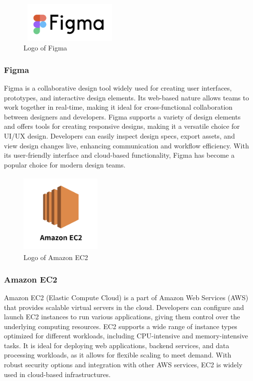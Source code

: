 \documentclass[conference]{IEEEtran}
\begin{document}
        \begin{figure}[htbp]
            \centerline{\includegraphics[width=5cm, height=2cm]{Images/logo/figma.png}}
            \caption{Logo of Figma}
            \label{fig}
        \end{figure}
        \subsubsection{Figma}
            Figma is a collaborative design tool widely used for creating user interfaces, prototypes, and interactive design elements. Its web-based nature allows teams to work together in real-time, making it ideal for cross-functional collaboration between designers and developers. Figma supports a variety of design elements and offers tools for creating responsive designs, making it a versatile choice for UI/UX design. Developers can easily inspect design specs, export assets, and view design changes live, enhancing communication and workflow efficiency. With its user-friendly interface and cloud-based functionality, Figma has become a popular choice for modern design teams.

        \begin{figure}[htbp]
            \centerline{\includegraphics[width=4cm, height=4cm]{Images/logo/aws.png}}
            \caption{Logo of Amazon EC2}
            \label{fig}
        \end{figure}
        \subsubsection{Amazon EC2}
            Amazon EC2 (Elastic Compute Cloud) is a part of Amazon Web Services (AWS) that provides scalable virtual servers in the cloud. Developers can configure and launch EC2 instances to run various applications, giving them control over the underlying computing resources. EC2 supports a wide range of instance types optimized for different workloads, including CPU-intensive and memory-intensive tasks. It is ideal for deploying web applications, backend services, and data processing workloads, as it allows for flexible scaling to meet demand. With robust security options and integration with other AWS services, EC2 is widely used in cloud-based infrastructures.
\end{document}
